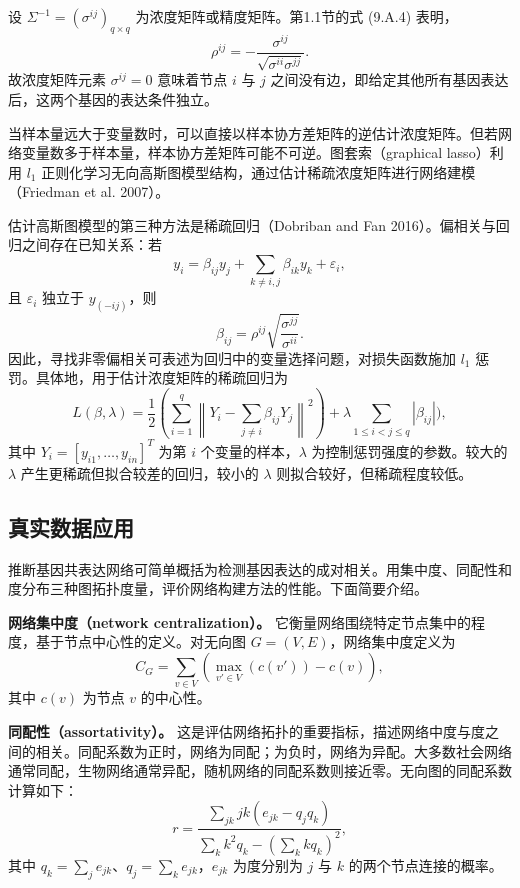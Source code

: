 设 $\Sigma^{-1}=(\sigma^{ij})_{q\times q}$ 为浓度矩阵或精度矩阵。第1.1节的式 (9.A.4) 表明，
\begin{equation}
\rho^{ij}=-\frac{\sigma^{ij}}{\sqrt{\sigma^{ii}\sigma^{jj}}}.
\tag{4.148}
\end{equation}
故浓度矩阵元素 $\sigma^{ij}=0$ 意味着节点 $i$ 与 $j$ 之间没有边，即给定其他所有基因表达后，这两个基因的表达条件独立。

当样本量远大于变量数时，可以直接以样本协方差矩阵的逆估计浓度矩阵。但若网络变量数多于样本量，样本协方差矩阵可能不可逆。图套索（graphical lasso）利用 $l_1$ 正则化学习无向高斯图模型结构，通过估计稀疏浓度矩阵进行网络建模（Friedman et al. 2007）。

估计高斯图模型的第三种方法是稀疏回归（Dobriban and Fan 2016）。偏相关与回归之间存在已知关系：若
\[
y_i=\beta_{ij}y_j+\sum_{k\ne i,j}\beta_{ik}y_k+\varepsilon_i,
\]
且 $\varepsilon_i$ 独立于 $y_{(-ij)}$，则
\[
\beta_{ij}=\rho^{ij}\sqrt{\frac{\sigma^{jj}}{\sigma^{ii}}}.
\]
因此，寻找非零偏相关可表述为回归中的变量选择问题，对损失函数施加 $l_1$ 惩罚。具体地，用于估计浓度矩阵的稀疏回归为
\begin{equation}
L(\beta,\lambda)=\frac12\left(\sum_{i=1}^{q}\left\lVert Y_i-\sum_{j\ne i}\beta_{ij}Y_j\right\rVert^2\right)
+\lambda\sum_{1\le i<j\le q}|\beta_{ij}|\bigr),
\tag{4.149}
\end{equation}
其中 $Y_i=[y_{i1},\ldots,y_{in}]^T$ 为第 $i$ 个变量的样本，$\lambda$ 为控制惩罚强度的参数。较大的 $\lambda$ 产生更稀疏但拟合较差的回归，较小的 $\lambda$ 则拟合较好，但稀疏程度较低。

\subsection{真实数据应用}
推断基因共表达网络可简单概括为检测基因表达的成对相关。用集中度、同配性和度分布三种图拓扑度量，评价网络构建方法的性能。下面简要介绍。

\par\medskip\noindent\textbf{网络集中度（network centralization）。}
它衡量网络围绕特定节点集中的程度，基于节点中心性的定义。对无向图 $G=(V,E)$，网络集中度定义为
\[
C_G=\sum_{v\in V}\left(\max_{v'\in V}(c(v'))-c(v)\right),
\]
其中 $c(v)$ 为节点 $v$ 的中心性。

\par\medskip\noindent\textbf{同配性（assortativity）。}
这是评估网络拓扑的重要指标，描述网络中度与度之间的相关。同配系数为正时，网络为同配；为负时，网络为异配。大多数社会网络通常同配，生物网络通常异配，随机网络的同配系数则接近零。无向图的同配系数计算如下：
\[
r=\frac{\sum_{jk}jk(e_{jk}-q_jq_k)}{\sum_k k^2q_k-(\sum_k kq_k)^2},
\]
其中 $q_k=\sum_j e_{jk}$、$q_j=\sum_k e_{jk}$，$e_{jk}$ 为度分别为 $j$ 与 $k$ 的两个节点连接的概率。

